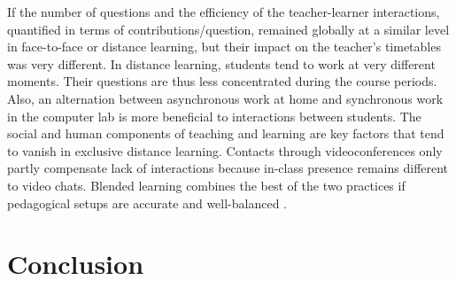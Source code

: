 \documentclass{aims}
\theoremstyle{definition}
\begin{document}
If the number of questions and the efficiency of the teacher-learner
interactions, quantified in terms of contributions/question, remained
globally at a similar level in face-to-face or distance learning, but
their impact on the teacher's timetables was very different. In distance
learning, students tend to work at very different moments. Their
questions are thus less concentrated during the course periods. Also, an
alternation between asynchronous work at home and synchronous work in
the computer lab is more beneficial to interactions between students.
The social and human components of teaching and learning are key factors
that tend to vanish in exclusive distance learning. Contacts through
videoconferences only partly compensate lack of interactions because
in-class presence remains different to video chats. Blended learning
combines the best of the two practices if pedagogical setups are
accurate and well-balanced \cite{Bernard2014}.

\hypertarget{conclusion}{%
\section{Conclusion}\label{conclusion}}
\end{document}
